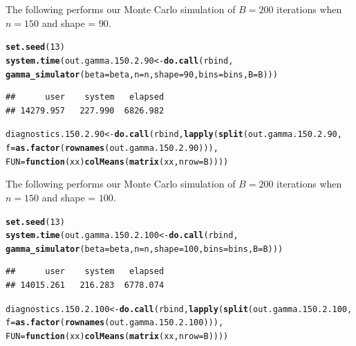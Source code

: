\documentclass[11pt]{article}\usepackage[]{graphicx}\usepackage[]{color}
\makeatletter
\newcommand{\hlnum}[1]{\textcolor[rgb]{0.686,0.059,0.569}{#1}}%
\newcommand{\hlstd}[1]{\textcolor[rgb]{0.345,0.345,0.345}{#1}}%
\newcommand{\hlkwa}[1]{\textcolor[rgb]{0.161,0.373,0.58}{\textbf{#1}}}%
\newcommand{\hlkwb}[1]{\textcolor[rgb]{0.69,0.353,0.396}{#1}}%
\newcommand{\hlkwc}[1]{\textcolor[rgb]{0.333,0.667,0.333}{#1}}%
\newcommand{\hlkwd}[1]{\textcolor[rgb]{0.737,0.353,0.396}{\textbf{#1}}}%
\newenvironment{kframe}{%
 \def\at@end@of@kframe{}%
 \ifinner\ifhmode%
  \def\at@end@of@kframe{\end{minipage}}%
  \begin{minipage}{\columnwidth}%
 \fi\fi%
 \def\FrameCommand##1{\hskip\@totalleftmargin \hskip-\fboxsep
 \colorbox{shadecolor}{##1}\hskip-\fboxsep
     \hskip-\linewidth \hskip-\@totalleftmargin \hskip\columnwidth}%
 \MakeFramed {\advance\hsize-\width
   \@totalleftmargin\z@ \linewidth\hsize
   \@setminipage}}%
 {\par\unskip\endMakeFramed%
 \at@end@of@kframe}
\newenvironment{knitrout}{}{} %
\makeatother
\begin{document}
The following performs our Monte Carlo simulation of $B = 200$ iterations 
when $n = 150$ and shape = $90$.

\begin{knitrout}
\color{fgcolor}\begin{kframe}
\begin{alltt}
\hlkwd{set.seed}\hlstd{(}\hlnum{13}\hlstd{)}
\hlkwd{system.time}\hlstd{(out.gamma.150.2.90} \hlkwb{<-} \hlkwd{do.call}\hlstd{(rbind,}
  \hlkwd{gamma_simulator}\hlstd{(}\hlkwc{beta} \hlstd{= beta,} \hlkwc{n} \hlstd{= n,} \hlkwc{shape} \hlstd{=} \hlnum{90}\hlstd{,} \hlkwc{bins} \hlstd{= bins,} \hlkwc{B} \hlstd{= B)))}
\end{alltt}
\begin{verbatim}
##      user    system   elapsed 
## 14279.957   227.990  6826.982
\end{verbatim}
\begin{alltt}
\hlstd{diagnostics.150.2.90} \hlkwb{<-} \hlkwd{do.call}\hlstd{(rbind,} \hlkwd{lapply}\hlstd{(}\hlkwd{split}\hlstd{(out.gamma.150.2.90,}
  \hlkwc{f} \hlstd{=} \hlkwd{as.factor}\hlstd{(}\hlkwd{rownames}\hlstd{(out.gamma.150.2.90))),}
  \hlkwc{FUN} \hlstd{=} \hlkwa{function}\hlstd{(}\hlkwc{xx}\hlstd{)} \hlkwd{colMeans}\hlstd{(}\hlkwd{matrix}\hlstd{(xx,} \hlkwc{nrow} \hlstd{= B))))}
\end{alltt}
\end{kframe}
\end{knitrout}




The following performs our Monte Carlo simulation of $B = 200$ iterations 
when $n = 150$ and shape = $100$.

\begin{knitrout}
\color{fgcolor}\begin{kframe}
\begin{alltt}
\hlkwd{set.seed}\hlstd{(}\hlnum{13}\hlstd{)}
\hlkwd{system.time}\hlstd{(out.gamma.150.2.100} \hlkwb{<-} \hlkwd{do.call}\hlstd{(rbind,}
  \hlkwd{gamma_simulator}\hlstd{(}\hlkwc{beta} \hlstd{= beta,} \hlkwc{n} \hlstd{= n,} \hlkwc{shape} \hlstd{=} \hlnum{100}\hlstd{,} \hlkwc{bins} \hlstd{= bins,} \hlkwc{B} \hlstd{= B)))}
\end{alltt}
\begin{verbatim}
##      user    system   elapsed 
## 14015.261   216.283  6778.074
\end{verbatim}
\begin{alltt}
\hlstd{diagnostics.150.2.100} \hlkwb{<-} \hlkwd{do.call}\hlstd{(rbind,} \hlkwd{lapply}\hlstd{(}\hlkwd{split}\hlstd{(out.gamma.150.2.100,}
  \hlkwc{f} \hlstd{=} \hlkwd{as.factor}\hlstd{(}\hlkwd{rownames}\hlstd{(out.gamma.150.2.100))),}
  \hlkwc{FUN} \hlstd{=} \hlkwa{function}\hlstd{(}\hlkwc{xx}\hlstd{)} \hlkwd{colMeans}\hlstd{(}\hlkwd{matrix}\hlstd{(xx,} \hlkwc{nrow} \hlstd{= B))))}
\end{alltt}
\end{kframe}
\end{knitrout}
\end{document}
